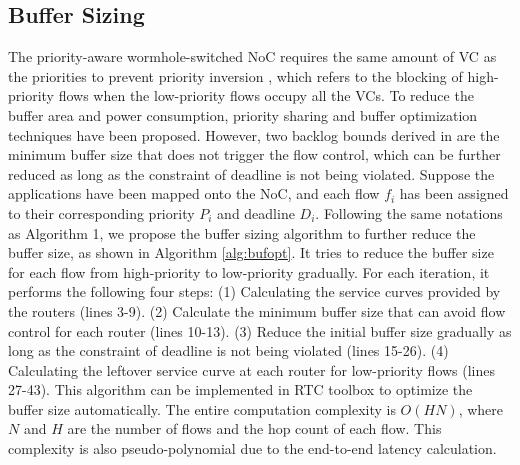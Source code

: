 \documentclass[10pt,journal]{IEEEtran}
\begin{document}
\subsection{Buffer Sizing}\label{bufferopt}
The priority-aware wormhole-switched NoC \cite{Shi:2008:RCA:1397757.1397996} requires the same amount of VC as the priorities to prevent priority inversion \cite{707545}, which refers to the blocking of high-priority flows when the low-priority flows occupy all the VCs. To reduce the buffer area and power consumption, priority sharing \cite{5161497} and buffer optimization \cite{189} techniques have been proposed. However, two backlog bounds derived in \cite{189} are the minimum buffer size that does not trigger the flow control, which can be further reduced as long as the constraint of deadline is not being violated. Suppose the applications have been mapped onto the NoC, and each flow $f_i$ has been assigned to their corresponding priority $P_i$ and deadline $D_i$. Following the same notations as Algorithm 1, we propose the buffer sizing algorithm to further reduce the buffer size, as shown in Algorithm \ref{alg:bufopt}. It tries to reduce the buffer size for each flow from high-priority to low-priority gradually. For each iteration, it performs the following four steps: (1) Calculating the service curves provided by the routers (lines 3-9). (2) Calculate the minimum buffer size that can avoid flow control for each router (lines 10-13). (3) Reduce the initial buffer size gradually as long as the constraint of deadline is not being violated (lines 15-26). (4) Calculating the leftover service curve at each router for low-priority flows (lines 27-43). This algorithm can be implemented in RTC toolbox \cite{rtc} to optimize the buffer size automatically. The entire computation complexity is $O(HN)$, where $N$ and $H$ are the number of flows and the hop count of each flow. This complexity is also pseudo-polynomial due to the end-to-end latency calculation.
\end{document}
